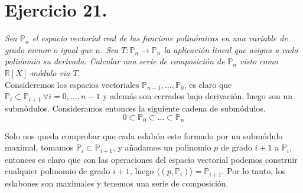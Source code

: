\section{Ejercicio 21. } \textit{Sea \(\mathbb{P}_n\) el espacio vectorial real
  de las funcione polinómicas en una variable de grado menor o igual que \(n\).
  Sea \(T: \mathbb{P}_n \to \mathbb{P}_n\) la aplicación lineal que asigna a
  cada polinomio su derivada. Calcular una serie de composición de
  \(\mathbb{P}_n\) visto como \(\mathbb{R}[X]\)-módulo via \(T\)}.\\

Consideremos los espacios vectoriales \(\mathbb{P}_{n-1},\dots,\mathbb{P}_0\),
es claro que \(\mathbb{P}_i \subset \mathbb{P}_{i+1} \ \forall i = 0,\dots,n-1
\) y además son cerrados bajo derivación, luego son un submódulos.
Consideramos entonces la siguiente cadena de submódulos.
\[
  0 \subset \mathbb{P}_0 \subset \dots \subset \mathbb{P}_n
\]

Solo nos queda comprobar que cada eslabón este formado por un submódulo maximal,
tomamos \(\mathbb{P}_i \subset \mathbb{P}_{i+1}\),  y añadamos un polinomio \(p\) de
grado \(i+1\) a \(\mathbb{P}_i \), entonces es claro que con las operaciones del
espacio vectorial podemos construir cualquier polinomio de grado \(i+1\), luego \(\langle
(p, \mathbb{P}_i) \rangle = \mathbb{P}_{i+1}\). Por lo tanto, los eslabones son
maximales y tenemos una serie de composición.
